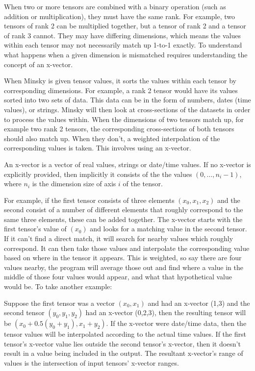 When two or more tensors are combined with a binary operation (such 
as addition or multiplication), they must have the same rank. For example,
two tensors of rank 2 can be multiplied together, but a tensor of rank 2 and 
a tensor of rank 3 cannot. They may have differing dimensions, which means
the values within each tensor may not necessarily match up 1-to-1 exactly.
To understand what happens when a given dimension is mismatched requires 
understanding the concept of an x-vector.

When Minsky is given tensor values, it sorts the values within each tensor
by corresponding dimensions. For example, a rank 2 tensor would have its
values sorted into two sets of data. This data can be in the form of numbers,
dates (time values), or strings. Minsky will then look at cross-sections of the
datasets in order to process the values within. When the dimensions of two
tensors match up, for example two rank 2 tensors, the corresponding
cross-sections of both tensors should also match up. When they don't, a
weighted interpolation of the corresponding values is taken. This involves
using an x-vector. 

An x-vector is a vector of real values, strings or date/time values. 
If no x-vector is explicitly provided, then implicitly it consists of the the values
$(0,\ldots,n_i-1)$, where $n_i$ is the dimension size of axis $i$
of the tensor.

For example, if the first tensor consists of three elements $(x_0, x_1, x_2)$
and the second consist of a number of different elements that roughly
correspond to the same three elements, these can be added together.
The x-vector starts with the first tensor's value of $(x_0)$ and looks for a
matching value in the second tensor. If it can't find a direct match, it will
search for nearby values which roughly correspond. It can then take those
values and interpolate the corresponding value based on where in the tensor
it appears. This is weighted, so say there are four values nearby, the program
will average those out and find where a value in the middle of those four
values would appear, and what that hypothetical value would be. To take
another example:

Suppose the first tensor was a vector $(x_0,x_1)$ and had an
x-vector (1,3) and the second tensor $(y_0,y_1,y_2)$ had an x-vector
(0,2,3), then the resulting tensor will be $(x_0+0.5(y_0+y_1),
x_1+y_2)$. If the x-vector were date/time data, then the tensor values
will be interpolated according to the actual time values. If the first
tensor's x-vector value lies outside the second tensor's x-vector,
then it doesn't result in a value being included in the output. The
resultant x-vector's range of values is the intersection of input
tensors' x-vector ranges.

